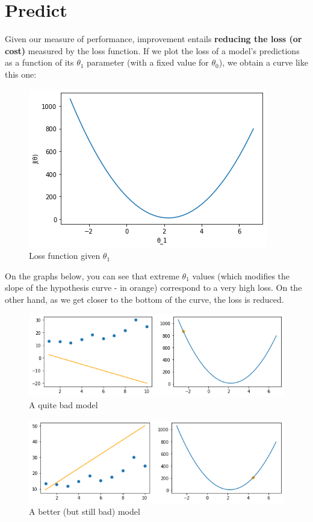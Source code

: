 \section*{Predict}
Given our measure of performance, improvement entails \textbf{reducing the loss (or cost)} measured by the loss function.
If we plot the loss of a model's predictions as a function of its $\theta_1$ parameter (with a fixed value for $\theta_0$), we obtain a curve like this one:
\begin{figure}[!h]
  \centering
  \includegraphics[scale=0.6]{assets/ex03_interlude_cost.png}
  \caption{Loss function given $\theta_1$}
\end{figure}

On the graphs below, you can see that extreme $\theta_1$ values (which modifies the slope of the hypothesis curve - in orange) correspond to a very high loss.
On the other hand, as we get closer to the bottom of the curve, the loss is reduced.  
\begin{figure}[!h]
  \centering
  \includegraphics[scale=0.6]{assets/ex03_cost_1.png}
  \caption{A quite bad model}
\end{figure}

\begin{figure}[!h]
  \centering
  \includegraphics[scale=0.6]{assets/ex03_cost_2.png}
  \caption{A better (but still bad) model}
\end{figure}

